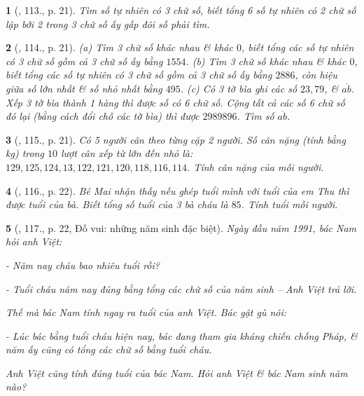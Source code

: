 \documentclass{article}
\newtheorem{baitoan}{}
\begin{document}
\begin{baitoan}[\cite{Binh_Toan_6_tap_1}, 113., p. 21]
	Tìm số tự nhiên có 3 chữ số, biết tổng 6 số tự nhiên có 2 chữ số lập bởi 2 trong 3 chữ số ấy gấp đôi số phải tìm.
\end{baitoan}

\begin{baitoan}[\cite{Binh_Toan_6_tap_1}, 114., p. 21]
	(a) Tìm 3 chữ số khác nhau \& khác $0$, biết tổng các số tự nhiên có 3 chữ số gồm cả 3 chữ số ấy bằng $1554$. (b) Tìm 3 chữ số khác nhau \& khác $0$, biết tổng các số tự nhiên có 3 chữ số gồm cả 3 chữ số ấy bằng $2886$, còn hiệu giữa số lớn nhất \& số nhỏ nhất bằng $495$. (c) Có 3 tờ bìa ghi các số $23,79$, \& $\overline{ab}$. Xếp 3 tờ bìa thành 1 hàng thì được số có 6 chữ số. Cộng tất cả các số 6 chữ số đó lại (bằng cách đổi chỗ các tờ bìa) thì được $2989896$. Tìm số $\overline{ab}$.
\end{baitoan}

\begin{baitoan}[\cite{Binh_Toan_6_tap_1}, 115., p. 21]
	Có 5 người cân theo từng cặp 2 người. Số cân nặng (tính bằng {\rm kg}) trong $10$ lượt cân xếp từ lớn đến nhỏ là: $129,125,124,13,122,121,120,118,116,114$. Tính cân nặng của mỗi người.
\end{baitoan}

\begin{baitoan}[\cite{Binh_Toan_6_tap_1}, 116., p. 22]
	Bé Mai nhận thấy nếu ghép tuổi mình với tuổi của em Thu thì được tuổi của bà. Biết tổng số tuổi của 3 bà cháu là $85$. Tính tuổi mỗi người.
\end{baitoan}

\begin{baitoan}[\cite{Binh_Toan_6_tap_1}, 117., p. 22, Đố vui: những năm sinh đặc biệt]
	Ngày đầu năm 1991, bác Nam hỏi anh Việt:
	
	- Năm nay cháu bao nhiêu tuổi rồi?
	
	- Tuổi cháu năm nay đúng bằng tổng các chữ số của năm sinh -- Anh Việt trả lời.
	
	Thế mà bác Nam tính ngay ra tuổi của anh Việt. Bác gật gù nói:
	
	- Lúc bác bằng tuổi cháu hiện nay, bác đang tham gia kháng chiến chống Pháp, \& năm ấy cũng có tổng các chữ số bằng tuổi cháu.
	
	Anh Việt cũng tính đúng tuổi của bác Nam. Hỏi anh Việt \& bác Nam sinh năm nào?
\end{baitoan}

\end{document}
